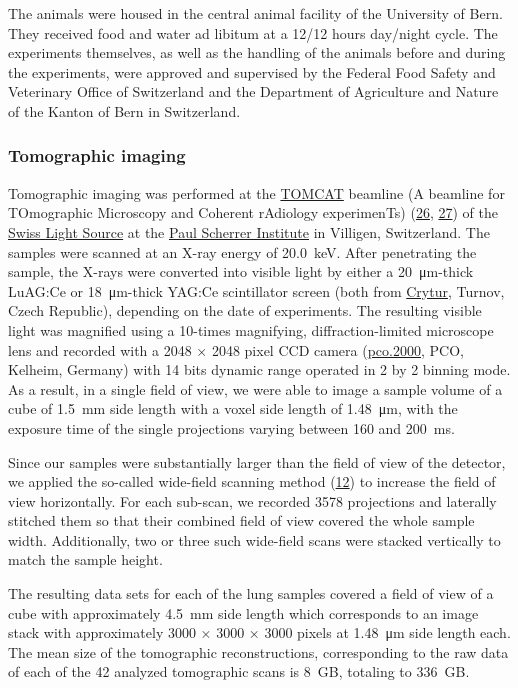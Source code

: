 \documentclass[
  american,
]{article}
\begin{document}
The animals were housed in the central animal facility of the University of Bern.
They received food and water ad libitum at a 12/12 hours day/night cycle.
The experiments themselves, as well as the handling of the animals before and during the experiments, were approved and supervised by the Federal Food Safety and Veterinary Office of Switzerland and the Department of Agriculture and Nature of the Kanton of Bern in Switzerland.

\hypertarget{tomographic-imaging}{%
\subsubsection{Tomographic imaging}\label{tomographic-imaging}}

Tomographic imaging was performed at the \href{https://www.psi.ch/sls/tomcat/}{TOMCAT} beamline (A beamline for TOmographic Microscopy and Coherent rAdiology experimenTs) (\protect\hyperlink{ref-knMAkPPz}{26}, \protect\hyperlink{ref-Cp0VRmEj}{27}) of the \href{https://www.psi.ch/sls/}{Swiss Light Source} at the \href{https://www.psi.ch/}{Paul Scherrer Institute} in Villigen, Switzerland.
The samples were scanned at an X-ray energy of 20.0~keV.
After penetrating the sample, the X-rays were converted into visible light by either a 20~μm-thick LuAG:Ce or 18~μm-thick YAG:Ce scintillator screen (both from \href{http://www.crytur.cz/}{Crytur}, Turnov, Czech Republic), depending on the date of experiments.
The resulting visible light was magnified using a 10-times magnifying, diffraction-limited microscope lens and recorded with a 2048 × 2048 pixel CCD camera (\href{https://www.pco.de/specialized-cameras/pco2000/}{pco.2000}, PCO, Kelheim, Germany) with 14 bits dynamic range operated in 2 by 2 binning mode.
As a result, in a single field of view, we were able to image a sample volume of a cube of 1.5~mm side length with a voxel side length of 1.48~μm, with the exposure time of the single projections varying between 160 and 200~ms.

Since our samples were substantially larger than the field of view of the detector, we applied the so-called wide-field scanning method (\protect\hyperlink{ref-VELl7OiR}{12}) to increase the field of view horizontally.
For each sub-scan, we recorded 3578 projections and laterally stitched them so that their combined field of view covered the whole sample width.
Additionally, two or three such wide-field scans were stacked vertically to match the sample height.

The resulting data sets for each of the lung samples covered a field of view of a cube with approximately 4.5~mm side length which corresponds to an image stack with approximately 3000 × 3000 × 3000 pixels at 1.48~μm side length each.
The mean size of the tomographic reconstructions, corresponding to the raw data of each of the 42 analyzed tomographic scans is 8~GB, totaling to 336~GB.
\end{document}
